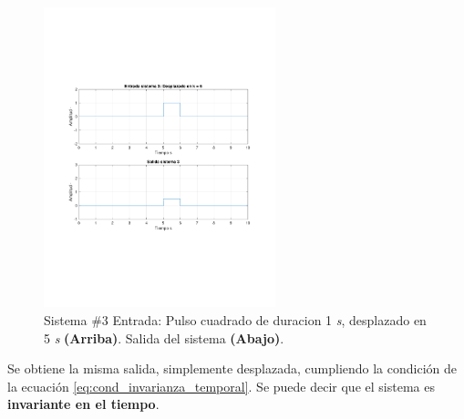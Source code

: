 			\begin{figure}[H]
				\center
				\includegraphics[width=0.6\textwidth,clip, trim = {2cm 7.0cm 2.2cm 7.0cm}]{../imgs/sistema_3_invarianza_temporal_retardo.pdf}
				\caption{Sistema \#3 Entrada: Pulso cuadrado de duracion 1 \textit{s}, desplazado en 5 \textit{s} \textbf{(Arriba)}. Salida del sistema \textbf{(Abajo)}.}
				\label{fig:s_3_time_invariant_test_2}
			\end{figure}
			
			Se obtiene la misma salida, simplemente desplazada, cumpliendo la condición de la ecuación \ref{eq:cond_invarianza_temporal}. Se puede decir que el sistema es \textbf{invariante en el tiempo}.

\newpage

